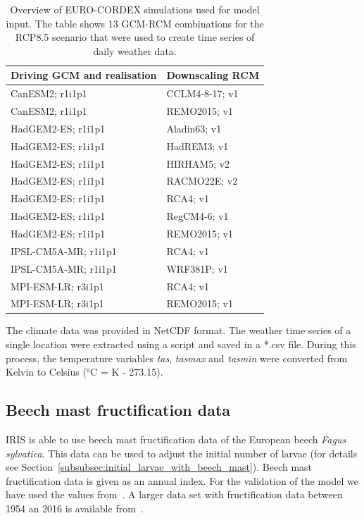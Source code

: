 \documentclass[a4paper, 11pt]{scrartcl}
\begin{document}
\begin{table}[h!]
\caption[Overview of EURO-CORDEX simulations used for model input]{Overview of EURO-CORDEX simulations used for model input. The table shows 13 GCM-RCM combinations for the RCP8.5 scenario that were used to create time series of daily weather data.}
\label{tab:climate_models}
\begin{tabularx}{\textwidth}{ll}
\toprule
\textbf{Driving GCM and realisation}  & \textbf{Downscaling RCM} 	\\
\midrule
CanESM2; r1i1p1 				 	  & CCLM4-8-17; v1  		 	\\
CanESM2; r1i1p1 				 	  & REMO2015; v1 				\\
HadGEM2-ES; r1i1p1 					  & Aladin63; v1 				\\
HadGEM2-ES; r1i1p1 					  & HadREM3; v1 				\\
HadGEM2-ES; r1i1p1 					  & HIRHAM5; v2 				\\
HadGEM2-ES; r1i1p1 					  & RACMO22E; v2 				\\
HadGEM2-ES; r1i1p1 					  & RCA4; v1 					\\
HadGEM2-ES; r1i1p1 					  & RegCM4-6; v1 				\\
HadGEM2-ES; r1i1p1 					  & REMO2015; v1 				\\
IPSL-CM5A-MR; r1i1p1 				  & RCA4; v1 					\\
IPSL-CM5A-MR; r1i1p1 				  & WRF381P; v1 				\\
MPI-ESM-LR; r3i1p1 					  & RCA4; v1 					\\
MPI-ESM-LR; r3i1p1 					  & REMO2015; v1				\\
\bottomrule
\end{tabularx}
\end{table}

The climate data was provided in NetCDF format. The weather time series of a single location were extracted using a script and saved in a *.csv file. During this process, the temperature variables \emph{tas}, \emph{tasmax} and \emph{tasmin} were converted from Kelvin to Celsius (°C = K - 273.15). 

\subsection{Beech mast fructification data}
IRIS is able to use beech mast fructification data of the European beech \textit{Fagus sylvatica}. This data can be used to adjust the initial number of larvae (for details see Section~\ref{subsubsec:initial_larvae_with_beech_mast}). Beech mast fructification data is given as an annual index. For the validation of the model we have used the values from~\textcite{Brugger.2018}. A larger data set with fructification data between 1954 an 2016 is available from~\textcite{Konnert.2016}.
\end{document}

